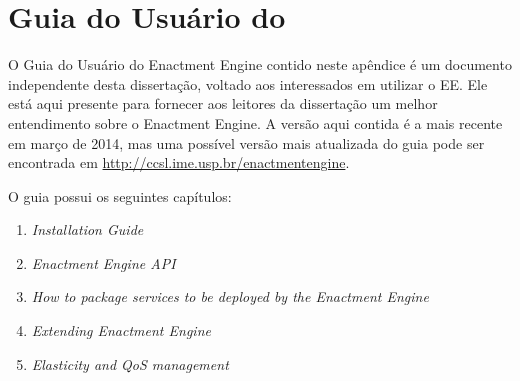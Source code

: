 \chapter{Guia do Usuário do \ee}
\label{ape:user_guide}

O Guia do Usuário do Enactment Engine contido neste apêndice
é um documento independente desta dissertação,
voltado aos interessados em utilizar o EE.
Ele está aqui presente para fornecer aos leitores
da dissertação um melhor entendimento sobre
o Enactment Engine.
A versão aqui contida é a mais recente em março de 2014,
mas uma possível versão mais atualizada do guia pode ser encontrada em
\url{http://ccsl.ime.usp.br/enactmentengine}.

O guia possui os seguintes capítulos:

\begin{enumerate}
\item \emph{Installation Guide}
\item \emph{Enactment Engine API}
\item \emph{How to package services to be deployed by the Enactment Engine}
\item \emph{Extending Enactment Engine}
\item \emph{Elasticity and QoS management}
\end{enumerate}


